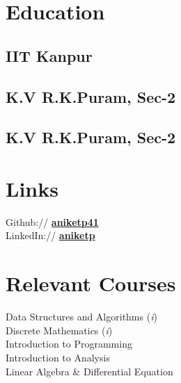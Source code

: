 \documentclass[]{deedy-resume-openfont}
\begin{document}
\begin{minipage}[t]{0.33\textwidth} 


\section{Education} 

\subsection{IIT Kanpur}
\sectionsep{}

\subsection{K.V R.K.Puram, Sec-2}
\sectionsep{}

\subsection{K.V R.K.Puram, Sec-2}


\section{Links} 
Github:// \href{https://github.com/aniketp41}{\bf aniketp41} \\
LinkedIn://  \href{https://www.linkedin.com/in/aniket-pandey-001a0613b}{\bf aniketp} \\



\section{Relevant Courses}
Data Structures and Algorithms (\textit{i}) \\
Discrete Mathematics (\textit{i}) \\
Introduction to Programming \\
Introduction to Analysis \\
Linear Algebra \& Differential Equation \\


\end{minipage}
\end{document}

